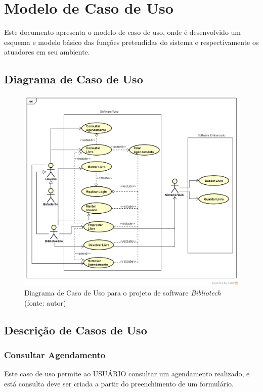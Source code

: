 \chapter[Modelo de Caso de Uso]{Modelo de Caso de Uso}
Este documento apresenta o modelo de caso de uso, onde é desenvolvido um esquema e modelo básico das funções pretendidas do sistema e respectivamente os atuadores em seu ambiente. 

\section{Diagrama de Caso de Uso}
\begin{figure}[!h]
\centering
\includegraphics[scale=0.50, angle = 360]{figuras/caso_uso}
\caption[]{Diagrama de Caso de Uso para o projeto de software \textit{Bibliotech} (fonte: autor)
}
\end{figure}
\FloatBarrier

\section{Descrição de Casos de Uso}

\subsection{Consultar Agendamento}
Este caso de uso permite ao USUÁRIO consultar um agendamento realizado, e está consulta deve ser criada a partir do preenchimento de um formulário.

